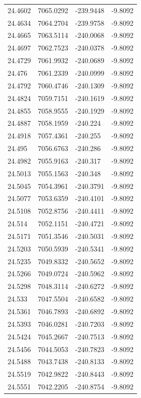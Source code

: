 \begin{table}[H]
\begin{tabular}{llll}
24.4602 & 7065.0292 & -239.9448 & -9.8092 \\
24.4634 & 7064.2704 & -239.9758 & -9.8092 \\
24.4665 & 7063.5114 & -240.0068 & -9.8092 \\
24.4697 & 7062.7523 & -240.0378 & -9.8092 \\
24.4729 & 7061.9932 & -240.0689 & -9.8092 \\
24.476 & 7061.2339 & -240.0999 & -9.8092 \\
24.4792 & 7060.4746 & -240.1309 & -9.8092 \\
24.4824 & 7059.7151 & -240.1619 & -9.8092 \\
24.4855 & 7058.9555 & -240.1929 & -9.8092 \\
24.4887 & 7058.1959 & -240.224 & -9.8092 \\
24.4918 & 7057.4361 & -240.255 & -9.8092 \\
24.495 & 7056.6763 & -240.286 & -9.8092 \\
24.4982 & 7055.9163 & -240.317 & -9.8092 \\
24.5013 & 7055.1563 & -240.348 & -9.8092 \\
24.5045 & 7054.3961 & -240.3791 & -9.8092 \\
24.5077 & 7053.6359 & -240.4101 & -9.8092 \\
24.5108 & 7052.8756 & -240.4411 & -9.8092 \\
24.514 & 7052.1151 & -240.4721 & -9.8092 \\
24.5171 & 7051.3546 & -240.5031 & -9.8092 \\
24.5203 & 7050.5939 & -240.5341 & -9.8092 \\
24.5235 & 7049.8332 & -240.5652 & -9.8092 \\
24.5266 & 7049.0724 & -240.5962 & -9.8092 \\
24.5298 & 7048.3114 & -240.6272 & -9.8092 \\
24.533 & 7047.5504 & -240.6582 & -9.8092 \\
24.5361 & 7046.7893 & -240.6892 & -9.8092 \\
24.5393 & 7046.0281 & -240.7203 & -9.8092 \\
24.5424 & 7045.2667 & -240.7513 & -9.8092 \\
24.5456 & 7044.5053 & -240.7823 & -9.8092 \\
24.5488 & 7043.7438 & -240.8133 & -9.8092 \\
24.5519 & 7042.9822 & -240.8443 & -9.8092 \\
24.5551 & 7042.2205 & -240.8754 & -9.8092 \\

\end{tabular}
\end{table}

